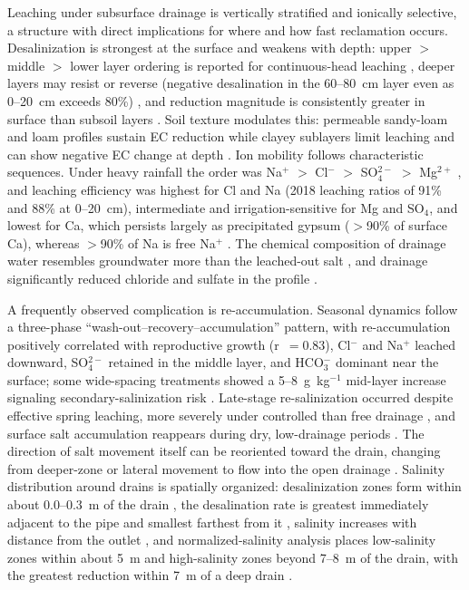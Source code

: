 \documentclass[11pt]{article}
\begin{document}
Leaching under subsurface drainage is vertically stratified and ionically selective, a structure with direct implications for where and how fast reclamation occurs. Desalinization is strongest at the surface and weakens with depth: upper $>$ middle $>$ lower layer ordering is reported for continuous-head leaching \parencite{Chen2022}, deeper layers may resist or reverse (negative desalination in the 60--80~cm layer even as 0--20~cm exceeds 80\%) \parencite{Han2023}, and reduction magnitude is consistently greater in surface than subsoil layers \parencite{Narjary2024,Tian2024}. Soil texture modulates this: permeable sandy-loam and loam profiles sustain EC reduction while clayey sublayers limit leaching and can show negative EC change at depth \parencite{Qin2025}. Ion mobility follows characteristic sequences. Under heavy rainfall the order was Na$^+$ $>$ Cl$^-$ $>$ SO$_4^{2-}$ $>$ Mg$^{2+}$ \parencite{Yu2016}, and leaching efficiency was highest for Cl and Na (2018 leaching ratios of 91\% and 88\% at 0--20~cm), intermediate and irrigation-sensitive for Mg and SO$_4$, and lowest for Ca, which persists largely as precipitated gypsum ($>$90\% of surface Ca), whereas $>$90\% of Na is free Na$^+$ \parencite{Qian2025}. The chemical composition of drainage water resembles groundwater more than the leached-out salt \parencite{Qian2025}, and drainage significantly reduced chloride and sulfate in the profile \parencite{Sharma2000}.

A frequently observed complication is re-accumulation. Seasonal dynamics follow a three-phase ``wash-out--recovery--accumulation'' pattern, with re-accumulation positively correlated with reproductive growth (r~$=0.83$), Cl$^-$ and Na$^+$ leached downward, SO$_4^{2-}$ retained in the middle layer, and HCO$_3^-$ dominant near the surface; some wide-spacing treatments showed a 5--8~g~kg$^{-1}$ mid-layer increase signaling secondary-salinization risk \parencite{Zhu2025b}. Late-stage re-salinization occurred despite effective spring leaching, more severely under controlled than free drainage \parencite{Dou2022}, and surface salt accumulation reappears during dry, low-drainage periods \parencite{Yu2016,Shi2021b}. The direction of salt movement itself can be reoriented toward the drain, changing from deeper-zone or lateral movement to flow into the open drainage \parencite{Okuda2020}. Salinity distribution around drains is spatially organized: desalinization zones form within about 0.0--0.3~m of the drain \parencite{Lu2019}, the desalination rate is greatest immediately adjacent to the pipe and smallest farthest from it \parencite{Heng2021}, salinity increases with distance from the outlet \parencite{Han2023}, and normalized-salinity analysis places low-salinity zones within about 5~m and high-salinity zones beyond 7--8~m of the drain, with the greatest reduction within 7~m of a deep drain \parencite{Mirlas2003,Benyamini2005}.
\end{document}
